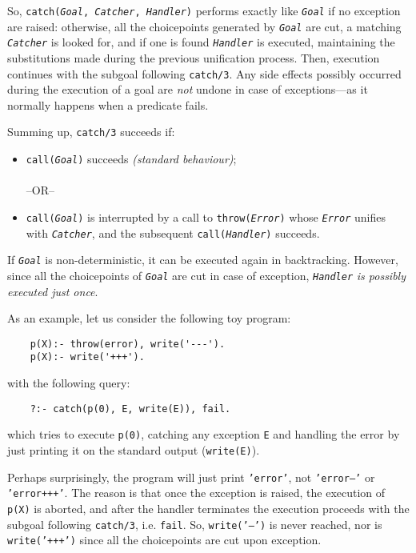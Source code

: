 So, \texttt{catch(\textit{Goal}, \textit{Catcher}, \textit{Handler})} performs exactly like \texttt{\textit{Goal}} if no exception are raised: otherwise, all the choicepoints generated by \texttt{\textit{Goal}} are cut, a matching \texttt{\textit{Catcher}} is looked for, and if one is found \texttt{\textit{Handler}} is executed, maintaining the substitutions made during the previous unification process.
%
Then, execution continues with the subgoal following \texttt{catch/3}.
%
Any side effects possibly occurred during the execution of a goal are \textit{not} undone in case of exceptions---as it normally happens when a predicate fails.

Summing up, \texttt{catch/3} succeeds if:
\begin{itemize}
  \item \texttt{call(\textit{Goal})} succeeds \textit{(standard behaviour)};\\\\
        --OR--
  \item \texttt{call(\textit{Goal})} is interrupted by a call to
      \texttt{throw(\textit{Error})} whose \texttt{\textit{Error}} unifies with
      \texttt{\textit{Catcher}}, and the subsequent \texttt{call(\textit{Handler})} succeeds.
\end{itemize}

\noindent If \texttt{\textit{Goal}} is non-deterministic, it can be executed again in
backtracking. However, since all the choicepoints of \texttt{\textit{Goal}} are cut in case of exception, \texttt{\textit{Handler}} \textit{is possibly executed just once}.

\smallskip

\noindent As an example, let us consider the following toy program:
\begin{verbatim}
    p(X):- throw(error), write('---').
    p(X):- write('+++').
\end{verbatim}

\noindent with the following query:

\begin{verbatim}
    ?:- catch(p(0), E, write(E)), fail.
\end{verbatim}
which tries to execute \texttt{p(0)}, catching any exception \texttt{E} and handling the error by just printing it on the standard output (\texttt{write(E)}).

Perhaps surprisingly, the program will just print \texttt{'error'}, not \texttt{'error---'} or \texttt{'error+++'}. The reason is that once the exception is raised, the execution of \texttt{p(X)} is aborted, and after the handler terminates the execution proceeds with the subgoal following \texttt{catch/3}, i.e. \texttt{fail}.
So, \texttt{write('---')} is never reached, nor is \texttt{write('+++')} since all the choicepoints are cut upon exception.

